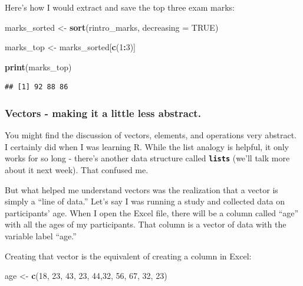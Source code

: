 \documentclass[
]{book}
\newenvironment{Shaded}{\begin{snugshade}}{\end{snugshade}}
\newcommand{\AttributeTok}[1]{\textcolor[rgb]{0.13,0.29,0.53}{#1}}
\newcommand{\ConstantTok}[1]{\textcolor[rgb]{0.56,0.35,0.01}{#1}}
\newcommand{\DecValTok}[1]{\textcolor[rgb]{0.00,0.00,0.81}{#1}}
\newcommand{\FunctionTok}[1]{\textcolor[rgb]{0.13,0.29,0.53}{\textbf{#1}}}
\newcommand{\NormalTok}[1]{#1}
\newcommand{\OtherTok}[1]{\textcolor[rgb]{0.56,0.35,0.01}{#1}}
\newcommand{\SpecialCharTok}[1]{\textcolor[rgb]{0.81,0.36,0.00}{\textbf{#1}}}
\begin{document}
Here's how I would extract and save the top three exam marks:

\begin{Shaded}
\begin{Highlighting}[]
\NormalTok{marks\_sorted }\OtherTok{\textless{}{-}} \FunctionTok{sort}\NormalTok{(rintro\_marks, }\AttributeTok{decreasing =} \ConstantTok{TRUE}\NormalTok{)}

\NormalTok{marks\_top }\OtherTok{\textless{}{-}}\NormalTok{ marks\_sorted[}\FunctionTok{c}\NormalTok{(}\DecValTok{1}\SpecialCharTok{:}\DecValTok{3}\NormalTok{)]}

\FunctionTok{print}\NormalTok{(marks\_top)}
\end{Highlighting}
\end{Shaded}

\begin{verbatim}
## [1] 92 88 86
\end{verbatim}

\hypertarget{vectors---making-it-a-little-less-abstract.}{%
\subsubsection{Vectors - making it a little less abstract.}\label{vectors---making-it-a-little-less-abstract.}}

You might find the discussion of vectors, elements, and operations very abstract. I certainly did when I was learning R. While the list analogy is helpful, it only works for so long - there's another data structure called \textbf{\texttt{lists}} (we'll talk more about it next week). That confused me.

But what helped me understand vectors was the realization that a vector is simply a ``line of data.'' Let's say I was running a study and collected data on participants' age. When I open the Excel file, there will be a column called ``age'' with all the ages of my participants. That column is a vector of data with the variable label ``age.''

Creating that vector is the equivalent of creating a column in Excel:

\begin{Shaded}
\begin{Highlighting}[]
\NormalTok{age }\OtherTok{\textless{}{-}} \FunctionTok{c}\NormalTok{(}\DecValTok{18}\NormalTok{, }\DecValTok{23}\NormalTok{, }\DecValTok{43}\NormalTok{, }\DecValTok{23}\NormalTok{, }\DecValTok{44}\NormalTok{,}\DecValTok{32}\NormalTok{, }\DecValTok{56}\NormalTok{, }\DecValTok{67}\NormalTok{, }\DecValTok{32}\NormalTok{, }\DecValTok{23}\NormalTok{)}
\end{Highlighting}
\end{Shaded}
\end{document}
